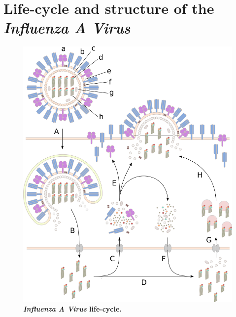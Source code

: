 \section{Life-cycle and structure of the \textit{Influenza A Virus}}

\begin{figure}[!hbt]
    \centering
    \includegraphics[width=\textwidth]{Graphics/cycle.pdf}
    \caption[\textit{Influenza A Virus} life-cycle]{\textbf{\textit{Influenza A Virus} life-cycle.} }
    \label{fig:Cycle}
\end{figure}


